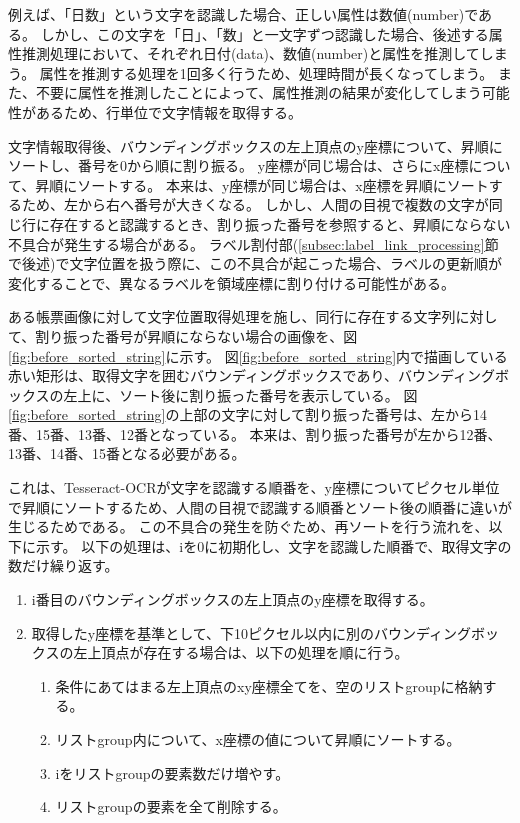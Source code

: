 例えば、「日数」という文字を認識した場合、正しい属性は数値(number)である。
しかし、この文字を「日」、「数」と一文字ずつ認識した場合、後述する属性推測処理において、それぞれ日付(data)、数値(number)と属性を推測してしまう。
属性を推測する処理を1回多く行うため、処理時間が長くなってしまう。
また、不要に属性を推測したことによって、属性推測の結果が変化してしまう可能性があるため、行単位で文字情報を取得する。

文字情報取得後、バウンディングボックスの左上頂点のy座標について、昇順にソートし、番号を0から順に割り振る。
y座標が同じ場合は、さらにx座標について、昇順にソートする。
本来は、y座標が同じ場合は、x座標を昇順にソートするため、左から右へ番号が大きくなる。
しかし、人間の目視で複数の文字が同じ行に存在すると認識するとき、割り振った番号を参照すると、昇順にならない不具合が発生する場合がある。
ラベル割付部(\ref{subsec:label_link_processing}節で後述)で文字位置を扱う際に、この不具合が起こった場合、ラベルの更新順が変化することで、異なるラベルを領域座標に割り付ける可能性がある。

ある帳票画像に対して文字位置取得処理を施し、同行に存在する文字列に対して、割り振った番号が昇順にならない場合の画像を、図\ref{fig:before_sorted_string}に示す。
図\ref{fig:before_sorted_string}内で描画している赤い矩形は、取得文字を囲むバウンディングボックスであり、バウンディングボックスの左上に、ソート後に割り振った番号を表示している。
図\ref{fig:before_sorted_string}の上部の文字に対して割り振った番号は、左から14番、15番、13番、12番となっている。
本来は、割り振った番号が左から12番、13番、14番、15番となる必要がある。

これは、Tesseract-OCRが文字を認識する順番を、y座標についてピクセル単位で昇順にソートするため、人間の目視で認識する順番とソート後の順番に違いが生じるためである。
この不具合の発生を防ぐため、再ソートを行う流れを、以下に示す。
以下の処理は、iを0に初期化し、文字を認識した順番で、取得文字の数だけ繰り返す。

\begin{enumerate}
    \item i番目のバウンディングボックスの左上頂点のy座標を取得する。
    \item 取得したy座標を基準として、下10ピクセル以内に別のバウンディングボックスの左上頂点が存在する場合は、以下の処理を順に行う。
    \begin{enumerate}
        \item 条件にあてはまる左上頂点のxy座標全てを、空のリストgroupに格納する。
        \item リストgroup内について、x座標の値について昇順にソートする。
        \item iをリストgroupの要素数だけ増やす。
        \item リストgroupの要素を全て削除する。
    \end{enumerate}
\end{enumerate}

